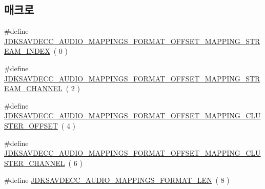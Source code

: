 \subsection*{매크로}
\begin{DoxyCompactItemize}
\item 
\#define \hyperlink{group__audio__mappings__format_gaa882647cd554bcfe7a5744b8cfd3388d}{J\+D\+K\+S\+A\+V\+D\+E\+C\+C\+\_\+\+A\+U\+D\+I\+O\+\_\+\+M\+A\+P\+P\+I\+N\+G\+S\+\_\+\+F\+O\+R\+M\+A\+T\+\_\+\+O\+F\+F\+S\+E\+T\+\_\+\+M\+A\+P\+P\+I\+N\+G\+\_\+\+S\+T\+R\+E\+A\+M\+\_\+\+I\+N\+D\+EX}~( 0 )
\item 
\#define \hyperlink{group__audio__mappings__format_ga6dd4f6c5a52a84e7646cef1ae20fabad}{J\+D\+K\+S\+A\+V\+D\+E\+C\+C\+\_\+\+A\+U\+D\+I\+O\+\_\+\+M\+A\+P\+P\+I\+N\+G\+S\+\_\+\+F\+O\+R\+M\+A\+T\+\_\+\+O\+F\+F\+S\+E\+T\+\_\+\+M\+A\+P\+P\+I\+N\+G\+\_\+\+S\+T\+R\+E\+A\+M\+\_\+\+C\+H\+A\+N\+N\+EL}~( 2 )
\item 
\#define \hyperlink{group__audio__mappings__format_gad5160e8fbcbbe93ceced69c7845ca055}{J\+D\+K\+S\+A\+V\+D\+E\+C\+C\+\_\+\+A\+U\+D\+I\+O\+\_\+\+M\+A\+P\+P\+I\+N\+G\+S\+\_\+\+F\+O\+R\+M\+A\+T\+\_\+\+O\+F\+F\+S\+E\+T\+\_\+\+M\+A\+P\+P\+I\+N\+G\+\_\+\+C\+L\+U\+S\+T\+E\+R\+\_\+\+O\+F\+F\+S\+ET}~( 4 )
\item 
\#define \hyperlink{group__audio__mappings__format_gada8b69df4c259ff90dd16955a184183c}{J\+D\+K\+S\+A\+V\+D\+E\+C\+C\+\_\+\+A\+U\+D\+I\+O\+\_\+\+M\+A\+P\+P\+I\+N\+G\+S\+\_\+\+F\+O\+R\+M\+A\+T\+\_\+\+O\+F\+F\+S\+E\+T\+\_\+\+M\+A\+P\+P\+I\+N\+G\+\_\+\+C\+L\+U\+S\+T\+E\+R\+\_\+\+C\+H\+A\+N\+N\+EL}~( 6 )
\item 
\#define \hyperlink{group__audio__mappings__format_ga27e53ab74d41b53c675374da298eafc5}{J\+D\+K\+S\+A\+V\+D\+E\+C\+C\+\_\+\+A\+U\+D\+I\+O\+\_\+\+M\+A\+P\+P\+I\+N\+G\+S\+\_\+\+F\+O\+R\+M\+A\+T\+\_\+\+L\+EN}~( 8 )
\end{DoxyCompactItemize}
